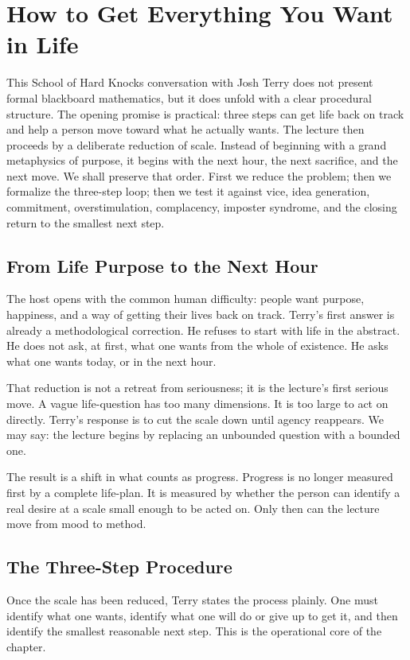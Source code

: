 \chapter{How to Get Everything You Want in Life}

This School of Hard Knocks conversation with Josh Terry does not present formal blackboard mathematics, but it does unfold with a clear procedural structure. The opening promise is practical: three steps can get life back on track and help a person move toward what he actually wants. The lecture then proceeds by a deliberate reduction of scale. Instead of beginning with a grand metaphysics of purpose, it begins with the next hour, the next sacrifice, and the next move. We shall preserve that order. First we reduce the problem; then we formalize the three-step loop; then we test it against vice, idea generation, commitment, overstimulation, complacency, imposter syndrome, and the closing return to the smallest next step.

\section{From Life Purpose to the Next Hour}

The host opens with the common human difficulty: people want purpose, happiness, and a way of getting their lives back on track. Terry's first answer is already a methodological correction. He refuses to start with life in the abstract. He does not ask, at first, what one wants from the whole of existence. He asks what one wants today, or in the next hour.

That reduction is not a retreat from seriousness; it is the lecture's first serious move. A vague life-question has too many dimensions. It is too large to act on directly. Terry's response is to cut the scale down until agency reappears. We may say: the lecture begins by replacing an unbounded question with a bounded one.

The result is a shift in what counts as progress. Progress is no longer measured first by a complete life-plan. It is measured by whether the person can identify a real desire at a scale small enough to be acted on. Only then can the lecture move from mood to method.

\section{The Three-Step Procedure}

Once the scale has been reduced, Terry states the process plainly. One must identify what one wants, identify what one will do or give up to get it, and then identify the smallest reasonable next step. This is the operational core of the chapter.

